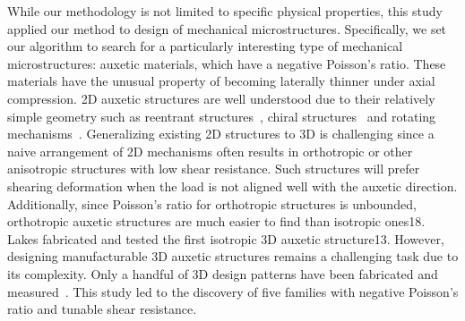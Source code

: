 While our methodology is not limited to specific physical properties, this study applied our method to design of mechanical microstructures. Specifically, we set our algorithm to search for a particularly interesting type of mechanical microstructures: auxetic materials, which have a negative Poisson's ratio.
These materials have the unusual property of becoming laterally thinner under axial compression.
2D auxetic structures are well understood due to their relatively simple geometry such as reentrant structures~\citep{sigmund1994materials,lakes1987foam},
chiral structures~\citep{prall1997properties,ha2016chiral}
and rotating mechanisms~\citep{babaee20133d,buckmann2014three}.
Generalizing existing 2D structures to 3D is challenging since a naive arrangement of 2D mechanisms often results in orthotropic or other anisotropic structures with low shear resistance. Such structures will prefer shearing deformation when the load is not aligned well with the auxetic direction. Additionally, since Poisson's ratio for orthotropic structures is unbounded, orthotropic auxetic structures are much easier to find than isotropic ones18. Lakes fabricated and tested the first isotropic 3D auxetic structure13. However, designing manufacturable 3D auxetic structures remains a challenging task due to its complexity.
Only a handful of 3D design patterns have been fabricated and measured~\citep{andreassen2014design,saxena2016three}.
This study led to the discovery of five families with negative Poisson's ratio and tunable shear resistance.
